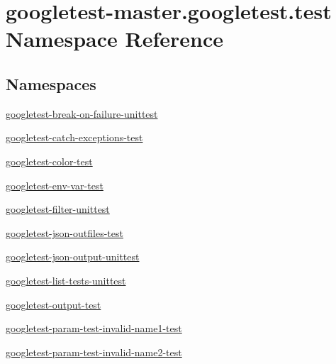 \hypertarget{namespacegoogletest-master_1_1googletest_1_1test}{}\section{googletest-\/master.googletest.\+test Namespace Reference}
\label{namespacegoogletest-master_1_1googletest_1_1test}
\subsection*{Namespaces}
\begin{DoxyCompactItemize}
\item 
 \mbox{\hyperlink{namespacegoogletest-master_1_1googletest_1_1test_1_1googletest-break-on-failure-unittest}{googletest-\/break-\/on-\/failure-\/unittest}}
\item 
 \mbox{\hyperlink{namespacegoogletest-master_1_1googletest_1_1test_1_1googletest-catch-exceptions-test}{googletest-\/catch-\/exceptions-\/test}}
\item 
 \mbox{\hyperlink{namespacegoogletest-master_1_1googletest_1_1test_1_1googletest-color-test}{googletest-\/color-\/test}}
\item 
 \mbox{\hyperlink{namespacegoogletest-master_1_1googletest_1_1test_1_1googletest-env-var-test}{googletest-\/env-\/var-\/test}}
\item 
 \mbox{\hyperlink{namespacegoogletest-master_1_1googletest_1_1test_1_1googletest-filter-unittest}{googletest-\/filter-\/unittest}}
\item 
 \mbox{\hyperlink{namespacegoogletest-master_1_1googletest_1_1test_1_1googletest-json-outfiles-test}{googletest-\/json-\/outfiles-\/test}}
\item 
 \mbox{\hyperlink{namespacegoogletest-master_1_1googletest_1_1test_1_1googletest-json-output-unittest}{googletest-\/json-\/output-\/unittest}}
\item 
 \mbox{\hyperlink{namespacegoogletest-master_1_1googletest_1_1test_1_1googletest-list-tests-unittest}{googletest-\/list-\/tests-\/unittest}}
\item 
 \mbox{\hyperlink{namespacegoogletest-master_1_1googletest_1_1test_1_1googletest-output-test}{googletest-\/output-\/test}}
\item 
 \mbox{\hyperlink{namespacegoogletest-master_1_1googletest_1_1test_1_1googletest-param-test-invalid-name1-test}{googletest-\/param-\/test-\/invalid-\/name1-\/test}}
\item 
 \mbox{\hyperlink{namespacegoogletest-master_1_1googletest_1_1test_1_1googletest-param-test-invalid-name2-test}{googletest-\/param-\/test-\/invalid-\/name2-\/test}}

\end{DoxyCompactItemize}
